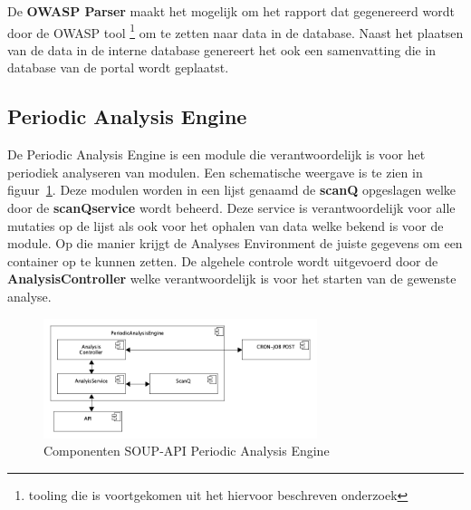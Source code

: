 De \textbf{OWASP Parser} maakt het mogelijk om het rapport dat gegenereerd wordt door de OWASP tool \footnote{tooling die is voortgekomen uit het hiervoor beschreven onderzoek} om te zetten naar data in de database. Naast het plaatsen van de data in de interne database genereert het ook een samenvatting die in database van de portal wordt geplaatst.

\subsection{Periodic Analysis Engine}\label{subsec:periodicanalysisengine}
De Periodic Analysis Engine is een module die verantwoordelijk is voor het periodiek analyseren van modulen. Een schematische weergave is te zien in figuur~\ref{fig:SOUPAPIPeriodicAnalysisEngineComps}. Deze modulen worden in een lijst genaamd de \textbf{scanQ} opgeslagen welke door de \textbf{scanQservice} wordt beheerd. Deze service is verantwoordelijk voor alle mutaties op de lijst als ook voor het ophalen van data welke bekend is voor de module. Op die manier krijgt de Analyses Environment de juiste gegevens om een container op te kunnen zetten. De algehele controle wordt uitgevoerd door de \textbf{AnalysisController} welke verantwoordelijk is voor het starten van de gewenste analyse.

\begin{figure}[bth]
    \myfloatalign
    \includegraphics[width=8cm]{gfx/umlet/exports/PeriodicAnalyisEngineComponents}
    \caption{Componenten SOUP-API Periodic Analysis Engine}
    \label{fig:SOUPAPIPeriodicAnalysisEngineComps}
\end{figure}

\newpage %
